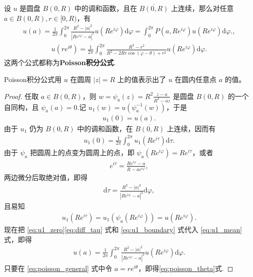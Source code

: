 \documentclass[../../main.tex]{subfiles}%
\begin{document}
\begin{theorem}\label{theorem:poisson_theta}
设 \(u\) 是圆盘 \(B(0,R)\) 中的调和函数，且在 \(\overline{B(0,R)}\) 上连续，那么对任意 \(a\in B(0,R),r \in [0,R)\)，有
\begin{align*}
u(a) = \frac{1}{2\pi} \int_{0}^{2\pi} \frac{R^2 - |a|^2}{|Re^{i\varphi} - a|^2} u(Re^{i\varphi}) \mathrm{d}\varphi = \int_{0}^{2\pi} P(a, Re^{i\varphi}) u(Re^{i\varphi}) \mathrm{d}\varphi.,
\end{align*}
\begin{align} 
u(re^{i\theta}) = \frac{1}{2\pi} \int_{0}^{2\pi} \frac{R^2 - r^2}{R^2 - 2Rr\cos(\varphi-\theta) + r^2} u(Re^{i\varphi}) \mathrm{d}\varphi. \label{eq:poisson_theta}
\end{align}
这两个公式都称为\textbf{Poisson积分公式}.
\end{theorem}
\begin{remark}
Poisson积分公式用 \(u\) 在圆周 \(|z|=R\) 上的值表示出了 \(u\) 在圆内任意点 \(a\) 的值。
\end{remark}
\begin{proof}
任取 \(a \in B(0,R)\)，则 \(w = \psi_a(z) = R^2 \frac{z-a}{R^2-\overline{a}z}\) 是圆盘 \(B(0,R)\) 的一个自同构，且 \(\psi_a(a) = 0\).记 \(u_1(w) = u(\psi_a^{-1}(w))\)，于是
\begin{align} u_1(0) = u(a). \label{eq:u1_zero} \end{align}
由于 \(u_1\) 仍为 \(B(0,R)\) 中的调和函数，在 \(\overline{B(0,R)}\) 上连续，因而有
\begin{align} 
u_1(0) = \frac{1}{2\pi} \int_{0}^{2\pi} u_1(Re^{i\tau}) \mathrm{d}\tau. \label{eq:u1_mean} 
\end{align}
由于 \(\psi_a\) 把圆周上的点变为圆周上的点，即 \( \psi_a(Re^{i\varphi}) = Re^{i\tau} \)，或者
\begin{align*} 
e^{i\tau} = \frac{Re^{i\varphi} - a}{R - \overline{a}e^{i\varphi}}, 
\end{align*}
两边微分后取绝对值，即得
\begin{align} 
\mathrm{d}\tau = \frac{R^2 - |a|^2}{|Re^{i\varphi} - a|^2} \mathrm{d}\varphi, \label{eq:diff_tau}
\end{align}
且易知
\begin{align} 
u_1(Re^{i\tau}) = u_1(\psi_a(Re^{i\varphi})) = u(Re^{i\varphi}). \label{eq:u1_boundary}
\end{align}
现在把 \eqref{eq:u1_zero}\eqref{eq:diff_tau} 式和 \eqref{eq:u1_boundary} 式代入 \eqref{eq:u1_mean} 式，即得
\begin{align} 
u(a) = \frac{1}{2\pi} \int_{0}^{2\pi} \frac{R^2 - |a|^2}{|Re^{i\varphi} - a|^2} u(Re^{i\varphi}) \mathrm{d}\varphi. \label{eq:poisson_general} 
\end{align}
只要在 \eqref{eq:poisson_general} 式中令 \(a = re^{i\theta}\)，即得\eqref{eq:poisson_theta}式.
\end{proof}
\end{document}
